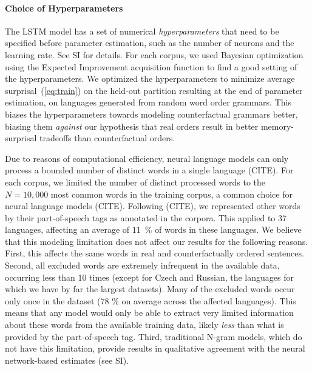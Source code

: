 \paragraph{Choice of Hyperparameters}

The LSTM model has a set of numerical \emph{hyperparameters} that need to be specified before parameter estimation, such as the number of neurons and the learning rate.
See SI for details.
For each corpus, we used Bayesian optimization using the Expected Improvement acquisition function \citep{snoek-practical-2012} to find a good setting of the hyperparameters.
We optimized the hyperparameters to minimize average surprisal~(\ref{eq:train}) on the held-out partition resulting at the end of parameter estimation, on languages generated from random word order grammars.
This biases the hyperparameters towards modeling counterfactual grammars better, biasing them \emph{against} our hypothesis that real orders result in better memory-surprisal tradeoffs than counterfactual orders.

Due to reasons of computational efficiency, neural language models can only process a bounded number of distinct words in a single language (CITE).
For each corpus, we limited the number of distinct processed words to the $N=10,000$ most common words in the training corpus, a common choice for neural language models (CITE).
Following (CITE), we represented other words by their part-of-speech tags as annotated in the corpora.
This applied to 37 languages, affecting an average of 11~\% of words in these languages.
We believe that this modeling limitation does not affect our results for the following reasons.
First, this affects the same words in real and counterfactually ordered sentences.
Second, all excluded words are extremely infrequent in the available data, occurring less than 10 times (except for Czech and Russian, the languages for which we have by far the largest datasets).
Many of the excluded words occur only once in the dataset (78 \% on average across the affected languages).
This means that any model would only be able to extract very limited information about these words from the available training data, likely \emph{less} than what is provided by the part-of-speech tag.
Third, traditional N-gram models, which do not have this limitation, provide results in qualitative agreement with the neural network-based estimates (see SI).





